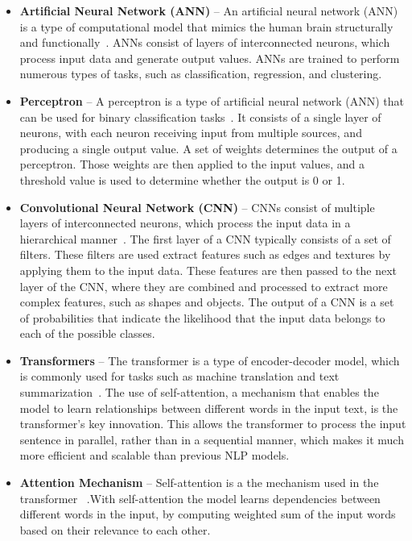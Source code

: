 \documentclass[runningheads]{llncs}
\begin{document}
\begin{itemize}

\item   \textbf{Artificial Neural Network (ANN)} – An artificial 
            neural network (ANN) is a type of computational model that mimics the human brain structurally and functionally~\cite{zupan1994introduction}. ANNs consist of layers of interconnected 
            neurons, which process input data and generate output 
            values. ANNs are trained to perform numerous types 
            of tasks, such as classification, regression, and clustering.

\item \textbf{Perceptron} – A perceptron is a type of artificial 
    neural network (ANN) that can be used for binary classification 
    tasks~\cite{gallant1990perceptron}. It consists of a single layer of neurons, with each neuron receiving input from multiple sources, and producing a single output value. A set of weights determines the output of a perceptron. Those weights are then applied to the input values, and a threshold value is used to determine whether the output is 0 or 1. 

\item \textbf{Convolutional Neural Network (CNN)} – CNNs 
    consist of multiple layers of interconnected neurons, which process 
    the input data in a hierarchical manner~\cite{DBLP:journals/corr/OSheaN15}. The first layer of a CNN typically consists of a set of filters. These filters are used extract features such as edges and textures by applying them to the input data. These features are then passed to the next layer of the CNN, where 
    they are combined and processed to extract more complex features, 
    such as shapes and objects. The output of a CNN is a set of 
    probabilities that indicate the likelihood that the input data 
    belongs to each of the possible classes.  
    
\item \textbf{Transformers} – The transformer is a type of encoder-decoder model, which is commonly used 
    for tasks such as machine translation and text summarization~\cite{vaswani2017attention}. 
    The use of self-attention, a mechanism that enables the model to learn relationships between different words in the input text, is the transformer's key innovation. This allows 
    the transformer to process the input sentence in parallel, 
    rather than in a sequential manner, which makes it much 
    more efficient and scalable than previous NLP models.

\item \textbf{Attention Mechanism} – Self-attention is a 
    the mechanism used in the transformer ~\cite{vaswani2017attention}.With self-attention the model learns dependencies between different 
    words in the input, by computing weighted sum of the input 
    words based on their relevance to each other.

\end{itemize}
\end{document}
